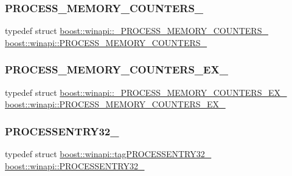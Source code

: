\subsubsection{\texorpdfstring{P\+R\+O\+C\+E\+S\+S\+\_\+\+M\+E\+M\+O\+R\+Y\+\_\+\+C\+O\+U\+N\+T\+E\+R\+S\+\_\+}{PROCESS\_MEMORY\_COUNTERS\_}}
{\footnotesize\ttfamily typedef struct \mbox{\hyperlink{structboost_1_1winapi_1_1___p_r_o_c_e_s_s___m_e_m_o_r_y___c_o_u_n_t_e_r_s__}{boost\+::winapi\+::\+\_\+\+P\+R\+O\+C\+E\+S\+S\+\_\+\+M\+E\+M\+O\+R\+Y\+\_\+\+C\+O\+U\+N\+T\+E\+R\+S\+\_\+}}  \mbox{\hyperlink{namespaceboost_1_1winapi_a740f637968b4bb912627e78bf3c838a3}{boost\+::winapi\+::\+P\+R\+O\+C\+E\+S\+S\+\_\+\+M\+E\+M\+O\+R\+Y\+\_\+\+C\+O\+U\+N\+T\+E\+R\+S\+\_\+}}}

\mbox{\label{namespaceboost_1_1winapi_a59b056a4dc77c72b3bebced5be353f9b}} 
\subsubsection{\texorpdfstring{P\+R\+O\+C\+E\+S\+S\+\_\+\+M\+E\+M\+O\+R\+Y\+\_\+\+C\+O\+U\+N\+T\+E\+R\+S\+\_\+\+E\+X\+\_\+}{PROCESS\_MEMORY\_COUNTERS\_EX\_}}
{\footnotesize\ttfamily typedef struct \mbox{\hyperlink{structboost_1_1winapi_1_1___p_r_o_c_e_s_s___m_e_m_o_r_y___c_o_u_n_t_e_r_s___e_x__}{boost\+::winapi\+::\+\_\+\+P\+R\+O\+C\+E\+S\+S\+\_\+\+M\+E\+M\+O\+R\+Y\+\_\+\+C\+O\+U\+N\+T\+E\+R\+S\+\_\+\+E\+X\+\_\+}}  \mbox{\hyperlink{namespaceboost_1_1winapi_a59b056a4dc77c72b3bebced5be353f9b}{boost\+::winapi\+::\+P\+R\+O\+C\+E\+S\+S\+\_\+\+M\+E\+M\+O\+R\+Y\+\_\+\+C\+O\+U\+N\+T\+E\+R\+S\+\_\+\+E\+X\+\_\+}}}

\mbox{\label{namespaceboost_1_1winapi_aa148b1a2cd4a16c95b05b56d8b31cc4c}} 
\subsubsection{\texorpdfstring{P\+R\+O\+C\+E\+S\+S\+E\+N\+T\+R\+Y32\+\_\+}{PROCESSENTRY32\_}}
{\footnotesize\ttfamily typedef struct \mbox{\hyperlink{structboost_1_1winapi_1_1tag_p_r_o_c_e_s_s_e_n_t_r_y32__}{boost\+::winapi\+::tag\+P\+R\+O\+C\+E\+S\+S\+E\+N\+T\+R\+Y32\+\_\+}}  \mbox{\hyperlink{namespaceboost_1_1winapi_aa148b1a2cd4a16c95b05b56d8b31cc4c}{boost\+::winapi\+::\+P\+R\+O\+C\+E\+S\+S\+E\+N\+T\+R\+Y32\+\_\+}}}

